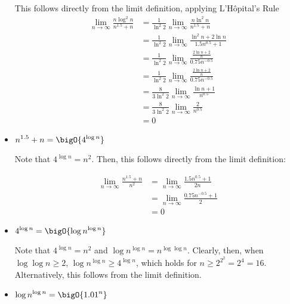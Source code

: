 \documentclass[draft]{article}
\begin{document}
\begin{solution}
\begin{itemize}
              This follows directly from the limit definition, applying L'H\^{o}pital's Rule
              \begin{align*}\lim_{n\to\infty}\frac{n\log^2{n}}{n^{1.5} + n}
                   & = \frac{1}{\ln^2{2}}\lim_{n\to\infty}\frac{n\ln^2{n}}{n^{1.5} + n}              \\
                   & = \frac{1}{\ln^2{2}}\lim_{n\to\infty}\frac{\ln^2{n} + 2\ln{n}}{1.5n^{0.5} + 1}  \\
                   & = \frac{1}{\ln^2{2}}\lim_{n\to\infty}\frac{\frac{2\ln{n} + 2}{n}}{0.75n^{-0.5}} \\
                   & = \frac{1}{\ln^2{2}}\lim_{n\to\infty}\frac{\frac{2\ln{n} + 2}{n}}{0.75n^{-0.5}} \\
                   & = \frac{8}{3\ln^2{2}}\lim_{n\to\infty}\frac{\ln n + 1}{n^{0.5}}                 \\
                   & = \frac{8}{3\ln^2{2}}\lim_{n\to\infty}\frac{2}{n^{0.5}}                         \\
                   & = 0
              \end{align*}

        \item $\displaystyle n^{1.5} + n = \bigO{4^{\log{n}}}$

              Note that $4^{\log{n}} = n^2$. Then, this follows directly from the limit definition:

              \begin{align*}\lim_{n\to\infty}\frac{n^{1.5} + n}{n^2}
                   & = \lim_{n\to\infty} \frac{1.5n^{0.5} + 1}{2n}  \\
                   & = \lim_{n\to\infty} \frac{0.75n^{-0.5} + 1}{2} \\
                   & = 0
              \end{align*}

        \item $\displaystyle 4^{\log{n}} = \bigO{\log{n}^{\log{n}}}$

              Note that $4^{\log{n}} = n^2$ and $\log{n}^{\log{n}} = n^{\log{\log{n}}}$. Clearly, then, when $\log\log{n} \geq 2$, $\log{n}^{\log{n}} \geq 4^{\log{n}}$, which holds for $n \geq 2^{2^2} = 2^4 = 16$. Alternatively, this follows from the limit definition.

        \item $\displaystyle \log{n}^{\log{n}} = \bigO{{1.01}^n}$


\end{itemize}
\end{solution}
\end{document}
